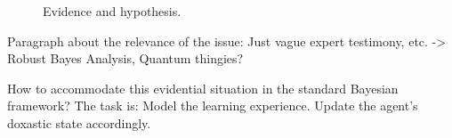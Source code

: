 \documentclass[11pt, a4paper]{scrartcl}
\begin{document}
\begin{figure}[h]
\centering
{}
\caption{Evidence and hypothesis.}
\label{fig:net}
\end{figure}

Paragraph about the relevance of the issue: Just vague expert testimony, etc. -> Robust Bayes Analysis, Quantum thingies? 

How to accommodate this evidential situation in the standard Bayesian framework? The task is: Model the learning experience. Update the agent's doxastic state accordingly. 
\end{document}
